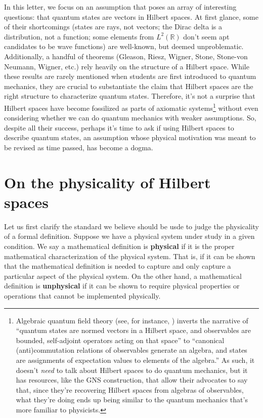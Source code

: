 \documentclass[10pt,twocolumn, nofootinbib]{revtex4-2}
\begin{document}
In this letter, we focus on an assumption that poses an array of interesting questions: that quantum states are vectors in Hilbert spaces. At first glance, some of their shortcomings (states are rays, not vectors; the Dirac delta is a distribution, not a function; some elements from $L^2(\mathbb{R})$ don't seem apt candidates to be wave functions) are well-known, but deemed unproblematic. Additionally, a handful of theorems (Gleason, Riesz, Wigner, Stone, Stone-von Neumann, Wigner, etc.) rely heavily on the structure of a Hilbert space. While these results are rarely mentioned when students are first introduced to quantum mechanics, they are crucial to substantiate the claim that Hilbert spaces are the right structure to characterize quantum states. Therefore, it's not a surprise that Hilbert spaces have become fossilized as parts of axiomatic systems\footnote{Algebraic quantum field theory (see, for instance, \citep{haag_local_1996}) inverts the narrative of ``quantum states are normed vectors in a Hilbert space, and observables are bounded, self-adjoint operators acting on that space'' to ``canonical (anti)commutation relations of observables generate an algebra, and states are assignments of expectation values to elements of the algebra.'' As such, it doesn't \textit{need} to talk about Hilbert spaces to do quantum mechanics, but it has resources, like the GNS construction, that allow their advocates to say that, since they're recovering Hilbert spaces from algebras of observables, what they're doing ends up being similar to the quantum mechanics that's more familiar to physicists.} without even considering whether we can do quantum mechanics with weaker assumptions. So, despite all their success, perhaps it's time to ask if using Hilbert spaces to describe quantum states, an assumption whose physical motivation was meant to be revised as time passed, has become a dogma.

\section{On the physicality of Hilbert spaces}

Let us first clarify the standard we believe should be usde to judge the physicality of a formal definition. Suppose we have a physical system under study in a given condition. We say a mathematical definition is \textbf{physical} if it is the proper mathematical characterization of the physical system. That is, if it can be shown that the mathematical definition is needed to capture and only capture a particular aspect of the physical system. On the other hand, a mathematical definition is \textbf{unphysical} if it can be shown to require physical properties or operations that cannot be implemented physically.
\end{document}
